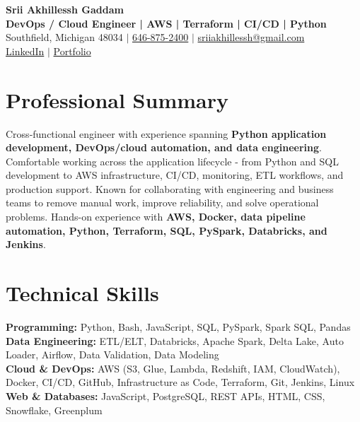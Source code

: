 \documentclass[letterpaper,10pt]{article}
\begin{document}
\fontsize{9.35pt}{10.45pt}\selectfont

\begin{center}
    {\LARGE \textbf{Srii Akhillessh Gaddam}} \\[-1pt]
    \textbf{DevOps / Cloud Engineer | AWS | Terraform | CI/CD | Python} \\[2pt]
    Southfield, Michigan 48034 $|$
    \href{tel:6468752400}{646-875-2400} $|$
    \href{mailto:sriiakhillessh@gmail.com}{sriiakhillessh@gmail.com} \\[1pt]
    \href{https://www.linkedin.com/in/srii-akhiilessh-gaddam-b48668191/}{LinkedIn} $|$
    \href{https://sriiakhillesshg.github.io/portfolio/}{Portfolio}
\end{center}
\vspace{-8pt}

\section{Professional Summary}
\small{Cross-functional engineer with experience spanning \textbf{Python application development, DevOps/cloud automation, and data engineering}. Comfortable working across the application lifecycle - from Python and SQL development to AWS infrastructure, CI/CD, monitoring, ETL workflows, and production support. Known for collaborating with engineering and business teams to remove manual work, improve reliability, and solve operational problems. Hands-on experience with \textbf{AWS, Docker, data pipeline automation, Python, Terraform, SQL, PySpark, Databricks, and Jenkins}.}

\section{Technical Skills}
\small{
\textbf{Programming:} Python, Bash, JavaScript, SQL, PySpark, Spark SQL, Pandas \\
\textbf{Data Engineering:} ETL/ELT, Databricks, Apache Spark, Delta Lake, Auto Loader, Airflow, Data Validation, Data Modeling \\
\textbf{Cloud \& DevOps:} AWS (S3, Glue, Lambda, Redshift, IAM, CloudWatch), Docker, CI/CD, GitHub, Infrastructure as Code, Terraform, Git, Jenkins, Linux \\
\textbf{Web \& Databases:} JavaScript, PostgreSQL, REST APIs, HTML, CSS, Snowflake, Greenplum
}
\end{document}
